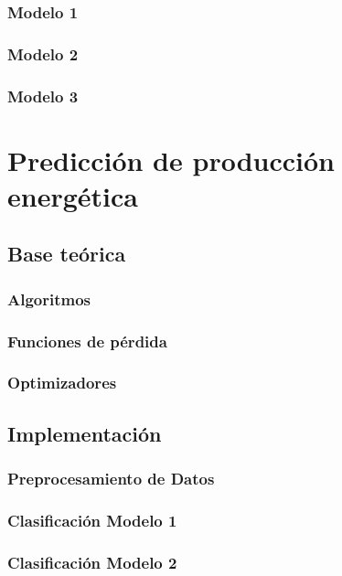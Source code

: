 \documentclass[a4paper,12pt]{article}
\begin{document}
\subsubsection{Modelo 1}

\subsubsection{Modelo 2}

\subsubsection{Modelo 3}

\section{Predicción de producción energética}

\subsection{Base teórica}

\subsubsection{Algoritmos}

\subsubsection{Funciones de pérdida}

\subsubsection{Optimizadores}

\subsection{Implementación}

\subsubsection{Preprocesamiento de Datos}

\subsubsection{Clasificación Modelo 1}

\subsubsection{Clasificación Modelo 2}
\end{document}
